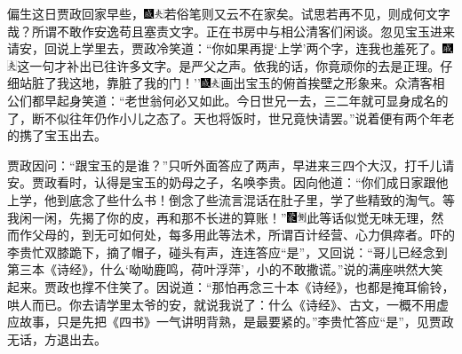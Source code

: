 偏生这日贾政回家早些，{\includegraphics[width=3mm]{../Images/00005}\includegraphics[width=3mm]{../Images/00012}\footnotesize \kaishu 若俗笔则又云不在家矣。试思若再不见，则成何文字哉？所谓不敢作安逸苟且塞责文字。}正在书房中与相公清客们闲谈。忽见宝玉进来请安，回说上学里去，贾政冷笑道：``你如果再提`上学'两个字，连我也羞死了。{\includegraphics[width=3mm]{../Images/00005}\includegraphics[width=3mm]{../Images/00012}\footnotesize \kaishu 这一句才补出已往许多文字。是严父之声。}依我的话，你竟顽你的去是正理。仔细站脏了我这地，靠脏了我的门！''{\includegraphics[width=3mm]{../Images/00005}\includegraphics[width=3mm]{../Images/00012}\footnotesize \kaishu 画出宝玉的俯首挨壁之形象来。}众清客相公们都早起身笑道：``老世翁何必又如此。今日世兄一去，三二年就可显身成名的了，断不似往年仍作小儿之态了。天也将饭时，世兄竟快请罢。''说着便有两个年老的携了宝玉出去。

贾政因问：``跟宝玉的是谁？''只听外面答应了两声，早进来三四个大汉，打千儿请安。贾政看时，认得是宝玉的奶母之子，名唤李贵。因向他道：``你们成日家跟他上学，他到底念了些什么书！倒念了些流言混话在肚子里，学了些精致的淘气。等我闲一闲，先揭了你的皮，再和那不长进的算账！''{\includegraphics[width=3mm]{../Images/00006}\includegraphics[width=3mm]{../Images/00011}\footnotesize \kaishu 此等话似觉无味无理，然而作父母的，到无可如何处，每多用此等法术，所谓百计经营、心力俱瘁者。}吓的李贵忙双膝跪下，摘了帽子，碰头有声，连连答应``是''，又回说：``哥儿已经念到第三本《诗经》，什么`呦呦鹿鸣，荷叶浮萍'，小的不敢撒谎。''说的满座哄然大笑起来。贾政也撑不住笑了。因说道：``那怕再念三十本《诗经》，也都是掩耳偷铃，哄人而已。你去请学里太爷的安，就说我说了：什么《诗经》、古文，一概不用虚应故事，只是先把《四书》一气讲明背熟，是最要紧的。''李贵忙答应``是''，见贾政无话，方退出去。

